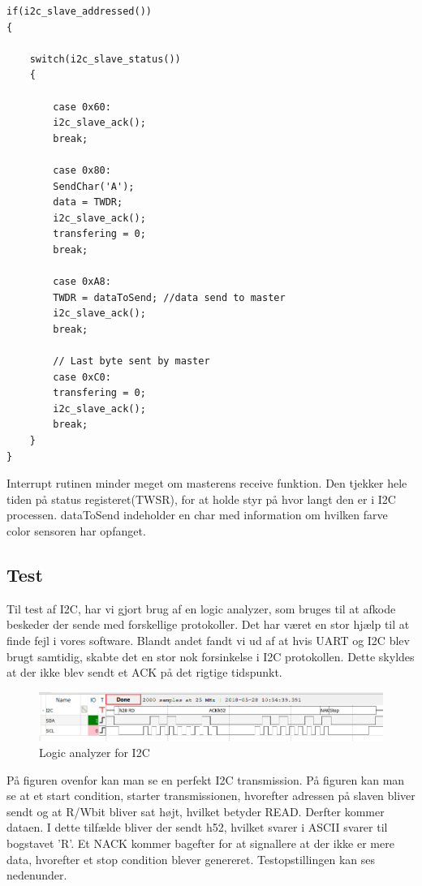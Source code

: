 \begin{lstlisting}
if(i2c_slave_addressed())
{
	
	switch(i2c_slave_status())
	{
		
		case 0x60:
		i2c_slave_ack();
		break;
		
		case 0x80:
		SendChar('A');
		data = TWDR;
		i2c_slave_ack();
		transfering = 0;
		break;
		
		case 0xA8:
		TWDR = dataToSend; //data send to master
		i2c_slave_ack();
		break;
		
		// Last byte sent by master
		case 0xC0:
		transfering = 0;
		i2c_slave_ack();
		break;
	}
}
\end{lstlisting}

Interrupt rutinen minder meget om masterens receive funktion. Den tjekker hele tiden på status registeret(TWSR), for at holde styr på hvor langt den er i I2C processen. dataToSend indeholder en char med information om hvilken farve color sensoren har opfanget. 



\subsection{Test}

Til test af I2C, har vi gjort brug af en logic analyzer, som bruges til at afkode beskeder der sende med forskellige protokoller. Det har været en stor hjælp til at finde fejl i vores software. Blandt andet fandt vi ud af at hvis UART og I2C blev brugt samtidig, skabte det en stor nok forsinkelse i I2C protokollen. Dette skyldes at der ikke blev sendt et ACK på det rigtige tidspunkt. 

\begin{figure}[H]
	\centering
	\includegraphics[width = 450pt]{Img/I2C_logic.png}
	\caption{Logic analyzer for I2C}
	\label{fig:I2C_Logic}
\end{figure}

På figuren ovenfor kan man se en perfekt I2C transmission. På figuren kan man se at et start condition, starter transmissionen, hvorefter adressen på slaven bliver sendt og at R/Wbit bliver sat højt, hvilket betyder READ. Derfter kommer dataen. I dette tilfælde bliver der sendt h52, hvilket svarer i ASCII svarer til bogstavet 'R'. Et NACK kommer bagefter for at signallere at der ikke er mere data, hvorefter et stop condition blever genereret. Testopstillingen kan ses nedenunder.

